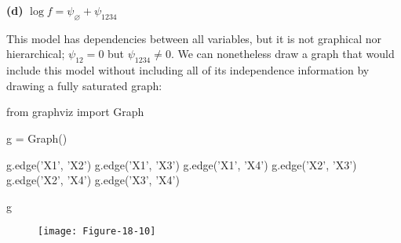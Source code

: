 \textbf{(d)} \(\log f = \psi_\varnothing + \psi_{1234}\)

This model has dependencies between all variables, but it is not
graphical nor hierarchical; \(\psi_{12} = 0\) but
\(\psi_{1234} \neq 0\). We can nonetheless draw a graph that would
include this model without including all of its independence information
by drawing a fully saturated graph:

\begin{python}
from graphviz import Graph

g = Graph()

g.edge('X1', 'X2')
g.edge('X1', 'X3')
g.edge('X1', 'X4')
g.edge('X2', 'X3')
g.edge('X2', 'X4')
g.edge('X3', 'X4')

g
\end{python}

\begin{figure}[H]
\texttt{[image: Figure-18-10]}
\end{figure}
